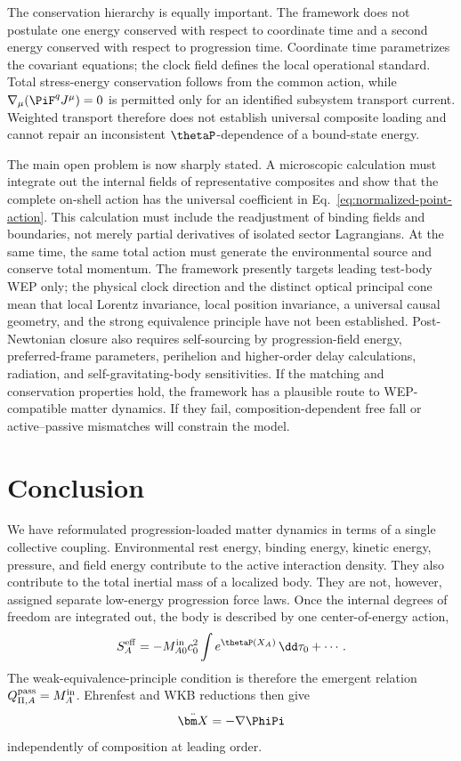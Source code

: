 \documentclass[12pt]{article}
\begin{document}
The conservation hierarchy is equally important.  The framework does not postulate one energy conserved with respect to coordinate time and a second energy conserved with respect to progression time.  Coordinate time parametrizes the covariant equations; the clock field defines the local operational standard.  Total stress-energy conservation follows from the common action, while \(\nabla_\mu(\PiF^qJ^\mu)=0\) is permitted only for an identified subsystem transport current.  Weighted transport therefore does not establish universal composite loading and cannot repair an inconsistent \(\thetaP\)-dependence of a bound-state energy.

The main open problem is now sharply stated.  A microscopic calculation must integrate out the internal fields of representative composites and show that the complete on-shell action has the universal coefficient in Eq.~\eqref{eq:normalized-point-action}.  This calculation must include the readjustment of binding fields and boundaries, not merely partial derivatives of isolated sector Lagrangians.  At the same time, the same total action must generate the environmental source and conserve total momentum.  The framework presently targets leading test-body WEP only; the physical clock direction and the distinct optical principal cone mean that local Lorentz invariance, local position invariance, a universal causal geometry, and the strong equivalence principle have not been established.  Post-Newtonian closure also requires self-sourcing by progression-field energy, preferred-frame parameters, perihelion and higher-order delay calculations, radiation, and self-gravitating-body sensitivities.  If the matching and conservation properties hold, the framework has a plausible route to WEP-compatible matter dynamics.  If they fail, composition-dependent free fall or active--passive mismatches will constrain the model.

\section{Conclusion}

We have reformulated progression-loaded matter dynamics in terms of a single collective coupling.  Environmental rest energy, binding energy, kinetic energy, pressure, and field energy contribute to the active interaction density.  They also contribute to the total inertial mass of a localized body.  They are not, however, assigned separate low-energy progression force laws.  Once the internal degrees of freedom are integrated out, the body is described by one center-of-energy action,
\begin{equation}
    S_A^{\rm eff}=-M_{A0}^{\rm in}c_0^2\int e^{\thetaP(X_A)}\,\dd\tau_0+\cdots .
\end{equation}
The weak-equivalence-principle condition is therefore the emergent relation \(Q_{\Pi,A}^{\rm pass}=M_A^{\rm in}\).  Ehrenfest and WKB reductions then give
\begin{equation}
    \ddot{\bm X}=-\nabla\PhiPi
\end{equation}
independently of composition at leading order.
\end{document}
